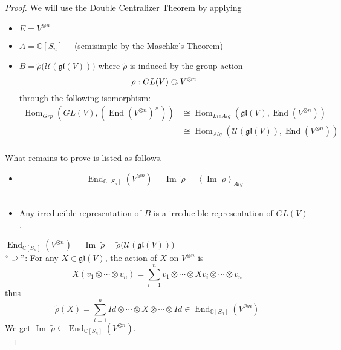 \documentclass[11pt,oneside]{amsart}
\numberwithin{equation}{section}
\theoremstyle{plain}
\theoremstyle{plain}
\numberwithin{equation}{section}
\theoremstyle{remark}
\newcommand{\Hom}{\operatorname{Hom}}
\newcommand{\End}{\operatorname{End}}
\newcommand{\im}{\operatorname{Im}\;}
\begin{document}
\begin{proof}
	We will use the Double Centralizer Theorem by applying
	\begin{itemize}
		\item $E=V^{\otimes n}$
		\item $A=\mathbb{C}[S_n]\quad$ (semisimple by the Maschke's Theorem)\\[-0.4cm]
		\item $B= \tilde{\rho}\big(\mathcal{U}(\mathfrak{gl}(V))\big)$ where $\tilde{\rho}$ is induced by the group action
		$$\rho:GL(V) \text{ \rotatebox[origin=c]{270}{$\circlearrowleft$} } V^{\otimes n}$$
		through the following isomorphism:
		\begin{equation*}
		\begin{aligned}
		\Hom_{Grp}(GL(V),(\End(V^{\otimes n})^{\times}))& \cong \Hom_{LieAlg}(\mathfrak{gl}(V),\End(V^{\otimes n}))\\
		& \cong 
		\Hom_{Alg}(\mathcal{U}(\mathfrak{gl}(V)),\End(V^{\otimes n}))\\
		\end{aligned}
		\end{equation*}
	\end{itemize}
		What remains to prove is listed as follows.
		\begin{itemize}
			\item $$\End_{\mathbb{C}[S_n]}(V^{\otimes n})= \im \tilde{\rho} =\left<\im \rho\right>_{Alg}$$\\[-0.2cm]
			\item Any irreducible representation of $B$ is a irreducible representation of $GL(V)$.
		\end{itemize}
	
	\noindent\underline{$\End_{\mathbb{C}[S_n]}(V^{\otimes n})= \im \tilde{\rho}=\tilde{\rho}\big(\mathcal{U}(\mathfrak{gl}(V))\big)$}\\[0cm]
	
	$``\supseteq"$: For any $X \in \mathfrak{gl}(V)$, the action of $X$ on $V^{\otimes n}$ is 
	$$X(v_1 \otimes \cdots \otimes v_n)=\sum_{i=1}^{n}v_1 \otimes \cdots \otimes Xv_i\otimes \cdots \otimes v_n$$
	thus
	$$\tilde{\rho}(X)=\sum_{i=1}^{n} Id \otimes \cdots \otimes X\otimes \cdots \otimes Id \in \End_{\mathbb{C}[S_n]}(V^{\otimes n})$$
	We get $\im \tilde{\rho} \subseteq \End_{\mathbb{C}[S_n]}(V^{\otimes n})$.\\
	

\end{proof}
\end{document}
